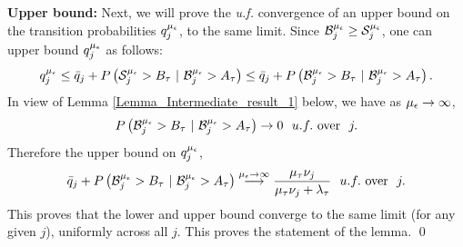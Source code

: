 {\bf Upper bound:} Next, we will prove the \textit{u.f.} convergence
of an upper bound on the transition probabilities $q^{{\mu_\epsilon}}_j$, to the
same limit. Since $\mathcal{B}^{\mu_\epsilon}_j \ge \mathcal{S}^{\mu_\epsilon}_j$, one can upper bound
$q_j^{\mu_\epsilon}$ as follows:
\begin{eqnarray*}
 q^{\mue}_j \leq \bar{q}_j + \prob{\S^{\mue}_j > B_\t\ |\ \B^{\mue}_j
	> A_\t} \leq \bar{q}_j + \prob{\B^{\mue}_j > B_\t\ |\ \B^{\mue}_j
	> A_\t} .
\end{eqnarray*}
In view of Lemma \ref{Lemma_Intermediate_result_1} below, we have  as ${\mu_\epsilon} \to \infty$,
\begin{eqnarray*}
\prob{\B^{\mue}_j > B_\t\ |\ \B^{\mue}_j> A_\t} \ra 0 \ \ u.f.  \mbox{ over } \  j.  
\end{eqnarray*}
Therefore the upper bound on $q_j^{\mu_\epsilon}$, 
\begin{eqnarray*}
  \bar{q}_j + P\left(\mathcal{B}^{{\mu_\epsilon}}_j > B_{\tau}\ |\ \mathcal{B}^{{\mu_\epsilon}}_j
	> A_{\tau}\right) \stackrel{{\mu_\epsilon} \to \infty}{\longrightarrow} \frac{{\mu_\tau} \nu_j}{{\mu_\tau} \nu_j + \lambda_{\tau}} \ \ u.f. \mbox{ over} \ \ j.  
\end{eqnarray*} 
This proves that the lower and upper bound converge to the same limit
(for any given $j$), uniformly across all $j$. This proves the
statement of the lemma. \qed

%
%

